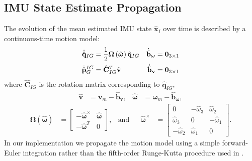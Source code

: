 \documentclass[letterpaper, 10 pt, conference]{ieeeconf}  %
\def\Vec#1{\mathbf{#1}}
\newcommand{\bbm}{\begin{bmatrix}}
\newcommand{\ebm}{\end{bmatrix}}
\begin{document}
\subsection{IMU State Estimate Propagation}
The evolution of the mean estimated IMU state $\hat{\Vec{x}}_I$ over time is described by a continuous-time motion model:
\begin{align}
    \dot{\hat{\Vec{q}}}_{IG} &= \frac{1}{2}\boldsymbol{\Omega}\left(\hat{\boldsymbol{\omega}}\right)\hat{\Vec{q}}_{IG} 
        & \dot{\hat{\Vec{b}}}_{\boldsymbol{\omega}}  &= \Vec{0}_{3\times1} \notag \\
    \dot{\hat{\Vec{p}}}^{IG}_G &= \hat{\Vec{C}}_{I G}^T \hat{\Vec{v}}
        & \dot{\hat{\Vec{b}}}_{\Vec{v}} &= \Vec{0}_{3\times1} 
\end{align}
where $\hat{\Vec{C}}_{I G}$ is the rotation matrix corresponding to $\hat{\Vec{q}}_{IG}$,
\begin{align*}
    \hat{\Vec{v}} &= \Vec{v}_m - \hat{\Vec{b}}_{\Vec{v}}, & \hat{\boldsymbol{\omega}} &= \boldsymbol{\omega}_m - \hat{\Vec{b}}_{\boldsymbol{\omega}},
\end{align*}
\begin{align*}
    \boldsymbol{\Omega}\left(\hat{\boldsymbol{\omega}}\right) &= \bbm -\hat{\boldsymbol{\omega}}^\times & \hat{\boldsymbol{\omega}} \\
                                                                -\hat{\boldsymbol{\omega}}^T & 0
                                                            \ebm ,
                                                            & \text{and} &&
    \hat{\boldsymbol{\omega}}^\times &=   \bbm    0 & -\hat{\omega}_3 & \hat{\omega}_2 \\
                                                \hat{\omega}_3 & 0 & -\hat{\omega}_1 \\
                                                -\hat{\omega}_2 & \hat{\omega}_1 & 0
                                            \ebm .
\end{align*}
In our implementation we propagate the motion model using a simple forward-Euler integration rather than the fifth-order Runge-Kutta procedure used in \cite{Mourikis:2007:ICRA}.
\end{document}
